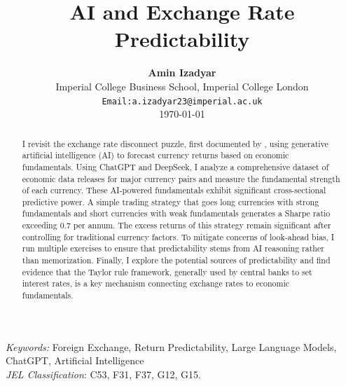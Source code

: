 \documentclass[12pt,oneside,letter]{article}
\begin{document}
	\thispagestyle{empty}
	
	\title{{\LARGE \textbf{AI and Exchange Rate Predictability}}\vspace{0.5cm}}
	
	\date{}
	
	\thispagestyle{empty}
	\author{%
		\begin{tabular}{c}
			\textbf{Amin Izadyar} \\
			Imperial College Business School, Imperial College London \\
			\texttt{Email:a.izadyar23@imperial.ac.uk} \\
			\large\today
		\end{tabular}
	}
	\maketitle
	
	\thispagestyle{empty}
	\newpage
	
	\vspace{4cm}
	
	\begin{abstract}
		\noindent 
		I revisit the exchange rate disconnect puzzle, first documented by \citet{Meese/Rogoff:1983}, using generative artificial intelligence (AI) to forecast currency returns based on economic fundamentals. Using ChatGPT and DeepSeek, I analyze a comprehensive dataset of economic data releases for major currency pairs and measure the fundamental strength of each currency. These AI-powered fundamentals exhibit significant cross-sectional predictive power. A simple trading strategy that goes long currencies with strong fundamentals and short currencies with weak fundamentals generates a Sharpe ratio exceeding 0.7 per annum. The excess returns of this strategy remain significant after controlling for traditional currency factors. To mitigate concerns of look-ahead bias, I run multiple exercises to ensure that predictability stems from AI reasoning rather than memorization. Finally, I explore the potential sources of predictability and find evidence that the Taylor rule framework, generally used by central banks to set interest rates, is a key mechanism connecting exchange rates to economic fundamentals.
		
	\end{abstract}
	
	\bigskip
	\noindent\textit{Keywords:} Foreign Exchange, Return Predictability, Large Language Models, ChatGPT, Artificial Intelligence \\
	\medskip
	\noindent\textit{JEL Classification}: C53, F31, F37, G12, G15. 
	
\end{document}
